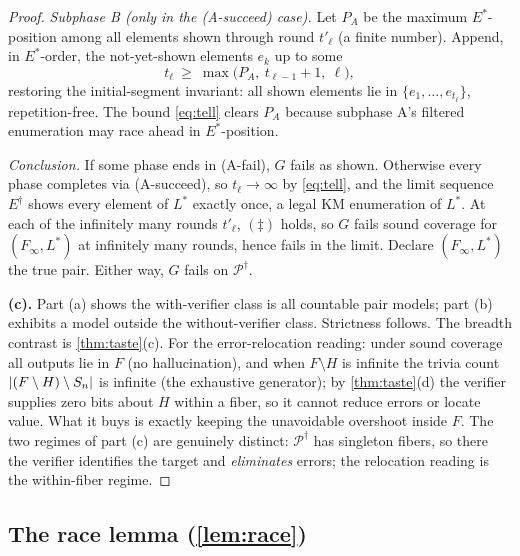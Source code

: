 \documentclass[11pt]{article}
\numberwithin{equation}{section}
\newcommand{\mc}[1]{\mathcal{#1}}
\DeclarePairedDelimiter{\abs}{\lvert}{\rvert}
\newcommand{\Amb}{F}
\newcommand{\Val}{H}
\newcommand{\Pairs}{\mc{P}}
\newcommand{\Seen}{S}
\theoremstyle{plain}
\theoremstyle{definition}
\theoremstyle{remark}
\begin{document}
\begin{proof}
\emph{Subphase B (only in the (A-succeed) case).} Let $P_A$ be the maximum $E^*$-position
among all elements shown through round $t'_\ell$ (a finite number). Append, in $E^*$-order,
the not-yet-shown elements $e_k$ up to some
\begin{equation}\label{eq:tell}
  t_\ell \ \ge\ \max\bigl(P_A,\ t_{\ell-1}+1,\ \ell\bigr),
\end{equation}
restoring the initial-segment invariant: all shown elements lie in $\{e_1, \dots,
e_{t_\ell}\}$, repetition-free. The bound \eqref{eq:tell} clears $P_A$ because subphase A's
filtered enumeration may race ahead in $E^*$-position.

\emph{Conclusion.} If some phase ends in (A-fail), $G$ fails as shown. Otherwise every phase
completes via (A-succeed), so $t_\ell \to \infty$ by \eqref{eq:tell}, and the limit sequence
$E^{\dagger}$ shows every element of $L^*$ exactly once, a legal KM enumeration of $L^*$. At
each of the infinitely many rounds $t'_\ell$, $(\ddagger)$ holds, so $G$ fails sound coverage
for $(\Amb_\infty, L^*)$ at infinitely many rounds, hence fails in the limit. Declare
$(\Amb_\infty, L^*)$ the true pair. Either way, $G$ fails on $\Pairs^{\dagger}$.

\medskip\noindent\textbf{(c).}\quad
Part (a) shows the with-verifier class is all countable pair models; part (b) exhibits a model
outside the without-verifier class. Strictness follows. The breadth contrast is
\cref{thm:taste}(c). For the error-relocation reading: under sound coverage all outputs lie in
$\Amb$ (no hallucination), and when $\Amb \setminus \Val$ is infinite the trivia count
$\abs{(\Amb \setminus \Val) \setminus \Seen_n}$ is infinite (the exhaustive generator); by
\cref{thm:taste}(d) the verifier supplies zero bits about $\Val$ within a fiber, so it cannot
reduce errors or locate value. What it buys is exactly keeping the unavoidable overshoot
inside $\Amb$. The two regimes of part (c) are genuinely distinct: $\Pairs^{\dagger}$ has
singleton fibers, so there the verifier identifies the target and \emph{eliminates} errors;
the relocation reading is the within-fiber regime.
\end{proof}

\subsection{The race lemma (\texorpdfstring{\cref{lem:race}}{Lemma 3})}
\label{app:race}
\end{document}
